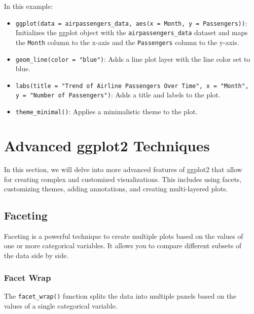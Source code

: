 \documentclass[
]{book}
\begin{document}
In this example:

\begin{itemize}
\item
  \texttt{ggplot(data\ =\ airpassengers\_data,\ aes(x\ =\ Month,\ y\ =\ Passengers))}: Initializes the ggplot object with the \texttt{airpassengers\_data} dataset and maps the \texttt{Month} column to the x-axis and the \texttt{Passengers} column to the y-axis.
\item
  \texttt{geom\_line(color\ =\ "blue")}: Adds a line plot layer with the line color set to blue.
\item
  \texttt{labs(title\ =\ "Trend\ of\ Airline\ Passengers\ Over\ Time",\ x\ =\ "Month",\ y\ =\ "Number\ of\ Passengers")}: Adds a title and labels to the plot.
\item
  \texttt{theme\_minimal()}: Applies a minimalistic theme to the plot.
\end{itemize}

\hypertarget{advanced-ggplot2-techniques}{%
\section{Advanced ggplot2 Techniques}\label{advanced-ggplot2-techniques}}

In this section, we will delve into more advanced features of ggplot2 that allow for creating complex and customized visualizations. This includes using facets, customizing themes, adding annotations, and creating multi-layered plots.

\hypertarget{faceting}{%
\subsection{Faceting}\label{faceting}}

Faceting is a powerful technique to create multiple plots based on the values of one or more categorical variables. It allows you to compare different subsets of the data side by side.

\hypertarget{facet-wrap}{%
\subsubsection*{Facet Wrap}\label{facet-wrap}}

The \texttt{facet\_wrap()} function splits the data into multiple panels based on the values of a single categorical variable.
\end{document}
